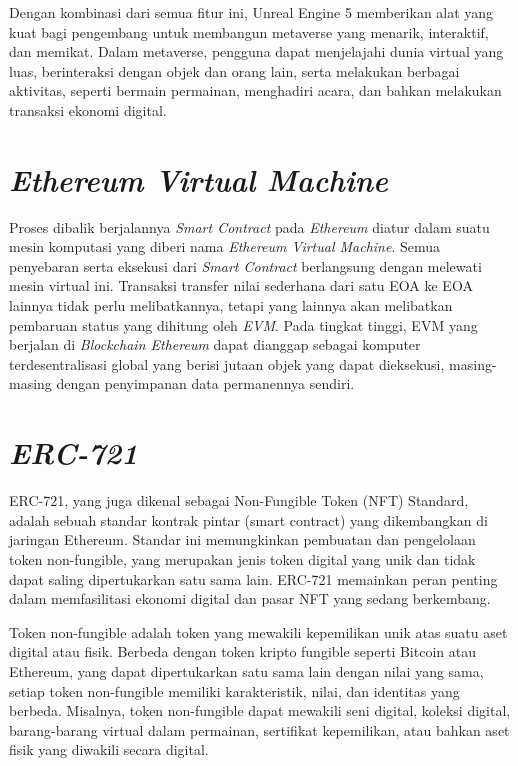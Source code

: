 Dengan kombinasi dari semua fitur ini, Unreal Engine 5 memberikan alat yang kuat bagi pengembang untuk membangun metaverse yang menarik, interaktif, dan memikat. Dalam metaverse, pengguna dapat menjelajahi dunia virtual yang luas,
berinteraksi dengan objek dan orang lain, serta melakukan berbagai aktivitas, seperti bermain permainan, menghadiri acara, dan bahkan melakukan transaksi ekonomi digital.

\section{\emph{Ethereum Virtual Machine}}

Proses dibalik berjalannya \emph{Smart Contract} pada \emph{Ethereum} diatur dalam suatu mesin komputasi yang diberi nama
\emph{Ethereum Virtual Machine}. Semua penyebaran serta eksekusi dari \emph{Smart Contract} berlangsung dengan melewati mesin virtual ini.
Transaksi transfer nilai sederhana dari satu EOA ke EOA lainnya tidak perlu melibatkannya, tetapi yang lainnya akan melibatkan pembaruan status yang dihitung oleh \emph{EVM}.
Pada tingkat tinggi, EVM yang berjalan di \emph{Blockchain Ethereum} dapat dianggap sebagai komputer terdesentralisasi global yang berisi jutaan objek yang dapat dieksekusi,
masing-masing dengan penyimpanan data permanennya sendiri.

\section{\emph{ERC-721}}
ERC-721, yang juga dikenal sebagai Non-Fungible Token (NFT) Standard, adalah sebuah standar kontrak pintar (smart contract) yang dikembangkan di jaringan Ethereum.
Standar ini memungkinkan pembuatan dan pengelolaan token non-fungible, yang merupakan jenis token digital yang unik dan tidak dapat saling dipertukarkan satu sama lain.
ERC-721 memainkan peran penting dalam memfasilitasi ekonomi digital dan pasar NFT yang sedang berkembang.

Token non-fungible adalah token yang mewakili kepemilikan unik atas suatu aset digital atau fisik. Berbeda dengan token kripto fungible seperti Bitcoin atau Ethereum,
yang dapat dipertukarkan satu sama lain dengan nilai yang sama, setiap token non-fungible memiliki karakteristik, nilai, dan identitas yang berbeda. Misalnya,
token non-fungible dapat mewakili seni digital, koleksi digital, barang-barang virtual dalam permainan, sertifikat kepemilikan, atau bahkan aset fisik yang diwakili secara digital.

